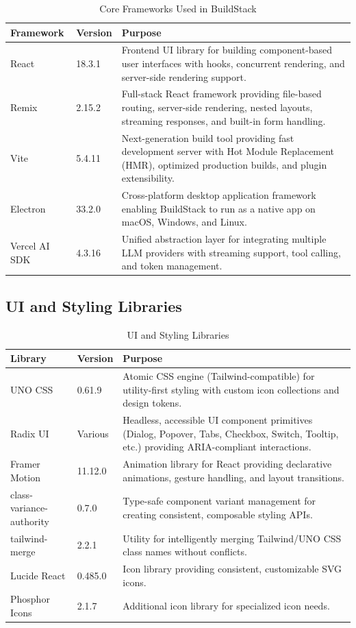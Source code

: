\documentclass[12pt,a4paper,openany]{report}
\begin{document}
\begin{table}[H]
\centering
\caption{Core Frameworks Used in BuildStack}
\label{tab:frameworks}
\begin{tabular}{|p{3.5cm}|p{2cm}|p{6.5cm}|}
\hline
\textbf{Framework} & \textbf{Version} & \textbf{Purpose} \\
\hline
React & 18.3.1 & Frontend UI library for building component-based user interfaces with hooks, concurrent rendering, and server-side rendering support. \\
\hline
Remix & 2.15.2 & Full-stack React framework providing file-based routing, server-side rendering, nested layouts, streaming responses, and built-in form handling. \\
\hline
Vite & 5.4.11 & Next-generation build tool providing fast development server with Hot Module Replacement (HMR), optimized production builds, and plugin extensibility. \\
\hline
Electron & 33.2.0 & Cross-platform desktop application framework enabling BuildStack to run as a native app on macOS, Windows, and Linux. \\
\hline
Vercel AI SDK & 4.3.16 & Unified abstraction layer for integrating multiple LLM providers with streaming support, tool calling, and token management. \\
\hline
\end{tabular}
\end{table}

\subsection{UI and Styling Libraries}

\begin{table}[H]
\centering
\caption{UI and Styling Libraries}
\label{tab:ui-libs}
\begin{tabular}{|p{4cm}|p{2cm}|p{6cm}|}
\hline
\textbf{Library} & \textbf{Version} & \textbf{Purpose} \\
\hline
UNO CSS & 0.61.9 & Atomic CSS engine (Tailwind-compatible) for utility-first styling with custom icon collections and design tokens. \\
\hline
Radix UI & Various & Headless, accessible UI component primitives (Dialog, Popover, Tabs, Checkbox, Switch, Tooltip, etc.) providing ARIA-compliant interactions. \\
\hline
Framer Motion & 11.12.0 & Animation library for React providing declarative animations, gesture handling, and layout transitions. \\
\hline
class-variance-authority & 0.7.0 & Type-safe component variant management for creating consistent, composable styling APIs. \\
\hline
tailwind-merge & 2.2.1 & Utility for intelligently merging Tailwind/UNO CSS class names without conflicts. \\
\hline
Lucide React & 0.485.0 & Icon library providing consistent, customizable SVG icons. \\
\hline
Phosphor Icons & 2.1.7 & Additional icon library for specialized icon needs. \\
\hline
\end{tabular}
\end{table}
\end{document}
